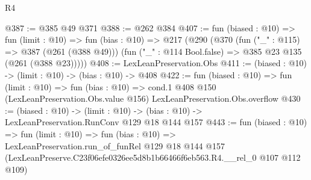 \begin{lexlean}{R4}
\begin{coremodule}
@387 := @385 @49 @371
@388 := @262 @384
@407 := fun (biased : @10) =>
  fun (limit : @10) =>
  fun (bias : @10) =>
  @217
    (@290
      (@370
        (fun ("_" : @115) => @387 (@261 (@388 @49)))
        (fun ("_" : @114 Bool.false) => @385 @23 @135 (@261 (@388 @23)))))
@408 := LexLeanPreservation.Obs
@411 := (biased : @10) -> (limit : @10) -> (bias : @10) -> @408
@422 := fun (biased : @10) =>
  fun (limit : @10) =>
  fun (bias : @10) =>
  cond.{1} @408 @150 (LexLeanPreservation.Obs.value @156) LexLeanPreservation.Obs.overflow
@430 := (biased : @10) ->
  (limit : @10) -> (bias : @10) -> LexLeanPreservation.RunConv @129 @18 @144 @157
@443 := fun (biased : @10) =>
  fun (limit : @10) =>
  fun (bias : @10) =>
  LexLeanPreservation.run_of_funRel
    @129
    @18
    @144
    @157
    (LexLeanPreserve.C23f06efe0326ee5d8b1b66466f6eb563.R4.__rel_0 @107 @112 @109)
\end{coremodule}
\end{lexlean}
